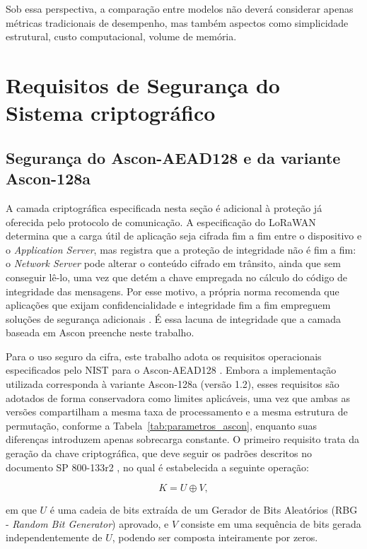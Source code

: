 Sob essa perspectiva, a comparação entre modelos não deverá considerar apenas métricas tradicionais de desempenho, mas também aspectos como simplicidade estrutural, custo computacional, volume de memória.


\section{Requisitos de Segurança do Sistema criptográfico}
\label{sec:requisitos_seguranca}
\subsection{Segurança do Ascon-AEAD128 e da variante Ascon-128a}
A camada criptográfica especificada nesta seção é adicional à proteção já oferecida pelo protocolo de comunicação. A especificação do LoRaWAN determina que a carga útil de aplicação seja cifrada fim a fim entre o dispositivo e o \textit{Application Server}, mas registra que a proteção de integridade não é fim a fim: o \textit{Network Server} pode alterar o conteúdo cifrado em trânsito, ainda que sem conseguir lê-lo, uma vez que detém a chave empregada no cálculo do código de integridade das mensagens. Por esse motivo, a própria norma recomenda que aplicações que exijam confidencialidade e integridade fim a fim empreguem soluções de segurança adicionais \cite{lorawan104}. É essa lacuna de integridade que a camada baseada em Ascon preenche neste trabalho.

Para o uso seguro da cifra, este trabalho adota os requisitos operacionais especificados pelo NIST para o Ascon-AEAD128 \cite{nist800232}. Embora a implementação utilizada corresponda à variante Ascon-128a (versão 1.2), esses requisitos são adotados de forma conservadora como limites aplicáveis, uma vez que ambas as versões compartilham a mesma taxa de processamento e a mesma estrutura de permutação, conforme a Tabela~\ref{tab:parametros_ascon}, enquanto suas diferenças introduzem apenas sobrecarga constante. O primeiro requisito trata da geração da chave criptográfica, que deve seguir os padrões descritos no documento SP 800-133r2 \cite{barker2020nist133}, no qual é estabelecida a seguinte operação:

\[
K = U \oplus V,
\]

em que $U$ é uma cadeia de bits extraída de um Gerador de Bits Aleatórios (RBG - \textit{Random Bit Generator}) aprovado, e $V$ consiste em uma sequência de bits gerada independentemente de $U$, podendo ser composta inteiramente por zeros.

